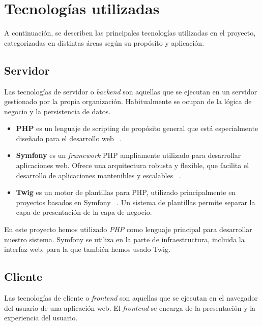 \section{Tecnologías utilizadas}\label{sec:tecnologias_utilizadas}

A continuación, se describen las principales tecnologías utilizadas en el proyecto, categorizadas en distintas áreas
según su propósito y aplicación.

\subsection{Servidor}

Las tecnologías de servidor o \textit{backend} son aquellas que se ejecutan en un servidor gestionado por la propia
organización.
Habitualmente se ocupan de la lógica de negocio y la persistencia de datos.

\begin{itemize}
    \item \textbf{PHP} es un lenguaje de scripting de propósito general que está especialmente diseñado para el
    desarrollo web ~\cite{url_php}.
    \item \textbf{Symfony} es un \textit{framework} PHP ampliamente utilizado para desarrollar aplicaciones web.
    Ofrece una arquitectura robusta y flexible, que facilita el desarrollo de aplicaciones mantenibles y escalables
    ~\cite{url_symfony}.
    \item \textbf{Twig} es un motor de plantillas para PHP, utilizado principalmente en proyectos basados en
    Symfony ~\cite{url_twig}.
    Un sistema de plantillas permite separar la capa de presentación de la capa de negocio.
\end{itemize}

En este proyecto hemos utilizado \textit{PHP} como lenguaje principal para desarrollar nuestro sistema.
Symfony se utiliza en la parte de infraestructura, incluida la interfaz web, para la que también hemos usado Twig.

\subsection{Cliente}

Las tecnologías de cliente o \textit{frontend} son aquellas que se ejecutan en el navegador del usuario de una
aplicación web.
El \textit{frontend} se encarga de la presentación y la experiencia del usuario.

